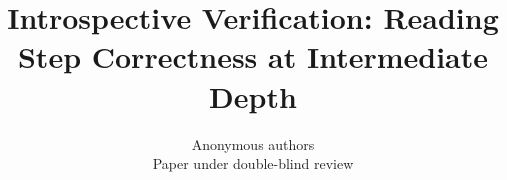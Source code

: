 \documentclass{article}
\title{Introspective Verification: Reading Step Correctness at Intermediate Depth}
\author{Anonymous authors\\Paper under double-blind review}
\theoremstyle{plain}
\theoremstyle{definition}
\theoremstyle{remark}
\begin{document}
\maketitle

\begin{abstract}

\end{abstract}










\appendix

\end{document}
